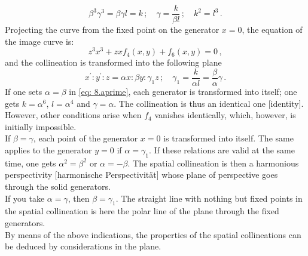 \documentclass[leqno]{article}
\begin{document}
\begin{equation}\label{eq: 8.b}
\beta^3 \gamma^3 = \beta \gamma l = k \, ; \quad \gamma = \frac{k}{\beta l} \, ; \quad k^2 = l^3 \, . \tag{b} 
\end{equation}
Projecting the curve from the fixed point on the generator $x=0$, the equation of the image curve is: 
\[
z^3 x^3 + zx f_4(x, y) + f_6(x, y) = 0 \, , 
\] 
and the collineation is transformed into the following plane
\begin{equation}\label{eq: 8.a1prime}
x^\prime : y^\prime : z = \alpha x : \beta y : \gamma_1 z \, ; \quad \gamma_1 = \frac{k}{\alpha l} = \frac{\beta}{\alpha} \gamma \, . \tag{$a_1^\prime$}
\end{equation}
If one sets $\alpha=\beta$ in \eqref{eq: 8.aprime}, each generator is transformed into itself; one gets $k=\alpha^6$, $l=\alpha^4$ and $\gamma=\alpha$. The collineation is thus an identical one [identity]. However, other conditions arise when $f_4$ vanishes identically, which, however, is initially impossible. \\
If $\beta = \gamma$, each point of the generator $x=0$ is transformed into itself. The same applies to the generator $y=0$ if $\alpha = \gamma_1$. If these relations are valid at the same time, one gets $\alpha^2 = \beta^2$ or $\alpha=-\beta$. The spatial collineation is then a harmonious perspectivity [harmonische Perspectivit\"at] whose plane of perspective goes through the solid generators. \\
If you take $\alpha = \gamma$, then $\beta = \gamma_1$. The straight line with nothing but fixed points in the spatial collineation is here the polar line of the plane through the fixed generators. \\
By means of the above indications, the properties of the spatial collineations can be deduced by considerations in the plane.
\end{document}

